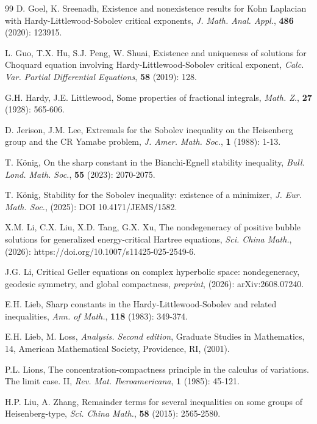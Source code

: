 \documentclass[11pt]{article}
\begin{document}
\begin{thebibliography}{99}
 D. Goel, K. Sreenadh,
 Existence and nonexistence results for Kohn Laplacian with Hardy-Littlewood-Sobolev critical exponents, {\em J. Math. Anal. Appl.}, {\bf 486} (2020): 123915.


 L. Guo, T.X. Hu, S.J. Peng, W. Shuai,
Existence and uniqueness of solutions for Choquard equation involving Hardy-Littlewood-Sobolev critical exponent, {\em Calc. Var. Partial Differential Equations}, {\bf 58} (2019): 128.

 G.H. Hardy, J.E. Littlewood,
Some properties of fractional integrals, {\em Math. Z.}, {\bf 27} (1928): 565-606.

 D. Jerison, J.M. Lee,
Extremals for the Sobolev inequality on the Heisenberg group and the CR Yamabe problem,
{\em J. Amer. Math. Soc.}, {\bf 1} (1988): 1-13.

T. K\"{o}nig, On the sharp constant in the Bianchi-Egnell stability inequality,
{\em Bull. Lond. Math. Soc.}, {\bf 55} (2023): 2070-2075.



T. K\"{o}nig, Stability for the Sobolev inequality: existence of a minimizer,
{\em J. Eur. Math. Soc.}, (2025): DOI 10.4171/JEMS/1582.


 X.M. Li, C.X. Liu, X.D. Tang, G.X. Xu,
The nondegeneracy of positive bubble solutions for generalized
energy-critical Hartree equations, {\em Sci. China Math.},
(2026): https://doi.org/10.1007/s11425-025-2549-6.



 J.G. Li,
Critical Geller equations on complex hyperbolic space: nondegeneracy, geodesic symmetry, and global compactness,
{\em preprint}, (2026): arXiv:2608.07240.


E.H. Lieb,
Sharp constants in the Hardy-Littlewood-Sobolev and related inequalities, {\em Ann. of Math.}, {\bf 118} (1983): 349-374.


  E.H. Lieb, M. Loss,
{\em Analysis. Second edition}, Graduate Studies in Mathematics, 14, American Mathematical Society,
 Providence, RI, (2001).

  P.L. Lions,
  The concentration-compactness principle in the calculus of variations. The limit case. II,
  {\em Rev. Mat. Iberoamericana}, {\bf 1} (1985): 45-121.


 H.P. Liu, A. Zhang,
Remainder terms for several inequalities on some groups of Heisenberg-type,
{\em Sci. China Math.}, {\bf 58} (2015): 2565-2580.



\end{thebibliography}
\end{document}
